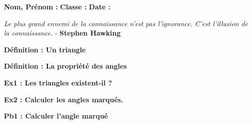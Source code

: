 



\textbf{Nom, Prénom :} \hspace{8cm} \textbf{Classe :} \hspace{3cm} \textbf{Date :}\\

\begin{center}
  \textit{Le plus grand ennemi de la connaissance n'est pas l'ignorance. C'est l'illusion de la connaissance.} - \textbf{Stephen Hawking}
\end{center}

\textbf{Définition : Un triangle}\\ \Pointilles[3] 

\textbf{Définition : La propriété des angles}\\ \Pointilles[3] 

\textbf{Ex1 : Les triangles existent-il ?}

\textbf{Ex2 : Calculer les angles marqués.}

\textbf{Pb1 : Calculer l'angle marqué}


